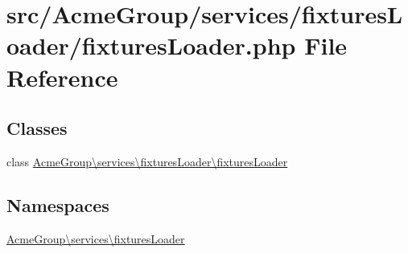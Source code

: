 \hypertarget{fixtures_loader_8php}{\section{src/\+Acme\+Group/services/fixtures\+Loader/fixtures\+Loader.php File Reference}
\label{fixtures_loader_8php}
}
\subsection*{Classes}
\begin{DoxyCompactItemize}
\item 
class \hyperlink{class_acme_group_1_1services_1_1fixtures_loader_1_1fixtures_loader}{Acme\+Group\textbackslash{}services\textbackslash{}fixtures\+Loader\textbackslash{}fixtures\+Loader}
\end{DoxyCompactItemize}
\subsection*{Namespaces}
\begin{DoxyCompactItemize}
\item 
 \hyperlink{namespace_acme_group_1_1services_1_1fixtures_loader}{Acme\+Group\textbackslash{}services\textbackslash{}fixtures\+Loader}
\end{DoxyCompactItemize}
